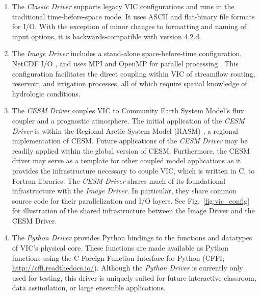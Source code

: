\documentclass[gmd, manuscript]{copernicus}
\begin{document}
  \begin{enumerate}
    \item  The \textit{Classic Driver} supports legacy VIC configurations and runs in the traditional time-before-space mode. It uses ASCII and flat-binary file formats for I/O.  With the exception of minor changes to formatting and naming of input options, it is backwards-compatible with version 4.2.d.

    \item The \textit{Image Driver} includes a stand-alone space-before-time configuration, NetCDF I/O \citep{Rew_1990}, and uses MPI and OpenMP for parallel processing \citep{Gropp_1996}. This configuration facilitates the direct coupling within VIC of streamflow routing, reservoir, and irrigation processes, all of which require spatial knowledge of hydrologic conditions.

    \item The \textit{CESM Driver} couples VIC to Community Earth System Model's \citep[CESM;][]{Hurrell_2013} flux coupler \citep[CPL7;][]{Craig_2012} and a prognostic atmosphere. The initial application of the \textit{CESM Driver} is within the Regional Arctic System Model (RASM) \citep{Hamman_2016a}, a regional implementation of CESM. Future applications of the \textit{CESM Driver} may be readily applied within the global version of CESM. Furthermore, the CESM driver may serve as a template for other coupled model applications as it provides the infrastructure necessary to couple VIC, which is written in C, to Fortran libraries. The \textit{CESM Driver} shares much of its foundational infrastructure with the \textit{Image Driver}. In particular, they share common source code for their parallelization and I/O layers. See Fig.~\ref{fig:vic_config} for illustration of the shared infrastructure between the Image Driver and the CESM Driver.

    \item The \textit{Python Driver} provides Python bindings to the functions and datatypes of VIC’s physical core. These functions are made available as Python functions using the C Foreign Function Interface for Python (CFFI; \url{http://cffi.readthedocs.io/}). Although the \textit{Python Driver} is currently only used for testing, this driver is uniquely suited for future interactive classroom, data assimilation, or large ensemble applications.

  \end{enumerate}
\end{document}
